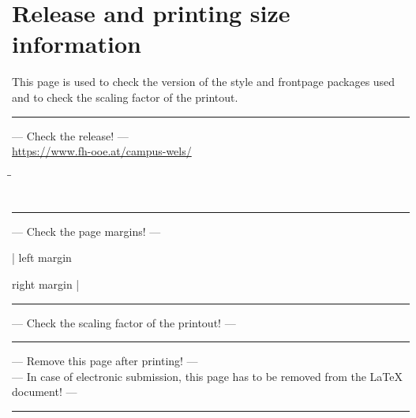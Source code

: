 \chapter*{Release and printing size information}
\thispagestyle{plain}
This page is used to check the version of the style and frontpage packages used and to check the scaling factor of the printout.\\
\rule{15cm}{0.3mm}
\begin{center}
	{\Large --- Check the release! ---}\\
	{\small \url{https://www.fh-ooe.at/campus-wels/}}\\
\end{center}
\begin{tabbing}
	\hspace{4cm}\=\hspace{4.5cm}\=\kill
	\>{\CurrentVersionMain ---}\\ 
	\>{\CurrentVersionStyle ---}\\ 
	\>{\CurrentVersionFrontpages ---} 
\end{tabbing} 
\rule{15cm}{0.3mm}
\begin{center}
	{\Large --- Check the page margins! ---}
\end{center}
\begin{flushleft}
	| left margin
\end{flushleft}
\vspace{-2.875\baselineskip}
\begin{flushright}
	right margin |
\end{flushright}
\vspace{-\baselinestretch\baselineskip}
\rule{15cm}{0.3mm}
\begin{center}
	{\Large --- Check the scaling factor of the printout! ---}\\
	\bigskip
\end{center}
\rule{15cm}{0.3mm}
\begin{center}
	{\Large --- Remove this page after printing! ---}\\
	\quad\newline
	{\Large --- In case of electronic submission, this page has to be removed from the {\LaTeX} document! ---}
\end{center}
\rule{15cm}{0.3mm}